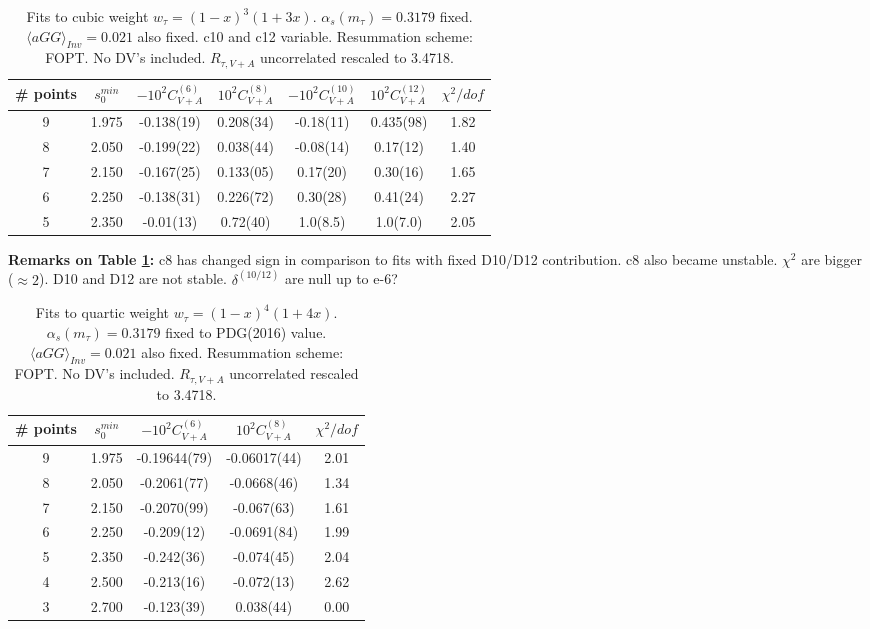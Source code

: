 \documentclass[12pt]{article}
\begin{document}
\begin{table}
  \centering
  \begin{tabular}{ | c c c c c c c | }
    \hline
    \# points & $s_0^{min}$ & $-10^2 C_{V+A}^{(6)}$ & $10^2 C_{V+A}^{(8)}$ &
    $-10^2 C_{V+A}^{(10)}$ & $10^2 C_{V+A}^{(12)}$ & $\chi^2/dof$
    \\ 
    \hline
    9 & 1.975 & -0.138(19) & 0.208(34) & -0.18(11) & 0.435(98) & 1.82 \\ 
    8 & 2.050 & -0.199(22) & 0.038(44) & -0.08(14) & 0.17(12)  & 1.40 \\
    7 & 2.150 & -0.167(25) & 0.133(05) & 0.17(20)  & 0.30(16)  & 1.65 \\
    6 & 2.250 & -0.138(31) & 0.226(72) & 0.30(28)  & 0.41(24)  & 2.27 \\
    5 & 2.350 & -0.01(13)  & 0.72(40)  & 1.0(8.5)  & 1.0(7.0)  & 2.05 \\
    \hline
  \end{tabular}
  \caption{Fits to cubic weight $w_{\tau} = (1 - x)^3 (1 + 3x)$.
    $\alpha_s(m_\tau) = 0.3179$ fixed. $\langle aGG \rangle_{Inv} = 0.021$
    also fixed. c10 and c12 variable. Resummation scheme: FOPT.
    No DV's included. $R_{\tau, V+A}$ uncorrelated rescaled to 3.4718.}
  \label{table:wCubeD10D12}
\end{table}
\textbf{Remarks on Table \ref{table:wCubeD10D12}:} 
c8 has changed sign in comparison to fits with fixed D10/D12 contribution. c8
also became unstable. $\chi^2$ are bigger ($\approx 2$). D10 and D12 are not
stable. $\delta^{(10/12)}$ are null up to e-6?

\begin{table}
  \centering
  \begin{tabular}{ | c c c c c | }
    \hline
    \# points & $s_0^{min}$ & $-10^2 C_{V+A}^{(6)}$ & $10^2 C_{V+A}^{(8)}$ & $\chi^2/dof$ \\ 
    \hline
    9 & 1.975 & -0.19644(79) & -0.06017(44) & 2.01 \\ 
    8 & 2.050 & -0.2061(77) & -0.0668(46) & 1.34 \\
    7 & 2.150 & -0.2070(99) & -0.067(63) & 1.61 \\
    6 & 2.250 & -0.209(12) & -0.0691(84) & 1.99 \\
    5 & 2.350 & -0.242(36) & -0.074(45) & 2.04 \\
    4 & 2.500 & -0.213(16) & -0.072(13) & 2.62 \\
    3 & 2.700 & -0.123(39)  & 0.038(44) & 0.00 \\
    \hline
  \end{tabular}
  \caption{Fits to quartic weight $w_{\tau} = (1 - x)^4 (1 + 4x)$.
    $\alpha_s(m_{\tau}) = 0.3179$ fixed to PDG(2016) value. $\langle aGG
    \rangle_{Inv} = 0.021$ also fixed. Resummation scheme: FOPT. No DV's included.
    $R_{\tau, V+A}$ uncorrelated rescaled to 3.4718.}
\end{table}
\end{document}
